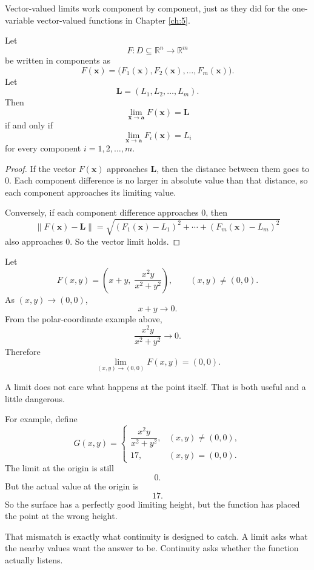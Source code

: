 Vector-valued limits work component by component, just as they did for the
one-variable vector-valued functions in Chapter \ref{ch:5}.

\begin{theorem}
Let
\[
    F:D\subseteq\mathbb R^n\to\mathbb R^m
\]
be written in components as
\[
    F(\mathbf x)=
    \bigl(F_1(\mathbf x),F_2(\mathbf x),\ldots,F_m(\mathbf x)\bigr).
\]
Let
\[
    \mathbf L=(L_1,L_2,\ldots,L_m).
\]
Then
\[
    \lim_{\mathbf x\to\mathbf a}F(\mathbf x)=\mathbf L
\]
if and only if
\[
    \lim_{\mathbf x\to\mathbf a}F_i(\mathbf x)=L_i
\]
for every component \(i=1,2,\ldots,m\).
\end{theorem}

\begin{proof}
If the vector \(F(\mathbf x)\) approaches \(\mathbf L\), then the distance between them
goes to \(0\).  Each component difference is no larger in absolute value than that
distance, so each component approaches its limiting value.

Conversely, if each component difference approaches \(0\), then
\[
    \|F(\mathbf x)-\mathbf L\|
    =
    \sqrt{
    (F_1(\mathbf x)-L_1)^2+\cdots+(F_m(\mathbf x)-L_m)^2
    }
\]
also approaches \(0\).  So the vector limit holds.
\end{proof}

\begin{example}
Let
\[
    F(x,y)=
    \left(
        x+y,\;
        \frac{x^2y}{x^2+y^2}
    \right),
    \qquad (x,y)\ne(0,0).
\]
As \((x,y)\to(0,0)\),
\[
    x+y\to0.
\]
From the polar-coordinate example above,
\[
    \frac{x^2y}{x^2+y^2}\to0.
\]
Therefore
\[
    \lim_{(x,y)\to(0,0)}F(x,y)=(0,0).
\]
\end{example}

A limit does not care what happens at the point itself.  That is both useful and a little
dangerous.

For example, define
\[
    G(x,y)=
    \begin{cases}
    \dfrac{x^2y}{x^2+y^2}, & (x,y)\ne(0,0),\\[2mm]
    17, & (x,y)=(0,0).
    \end{cases}
\]
The limit at the origin is still
\[
    0.
\]
But the actual value at the origin is
\[
    17.
\]
So the surface has a perfectly good limiting height, but the function has placed the
point at the wrong height.

That mismatch is exactly what continuity is designed to catch.  A limit asks what the
nearby values want the answer to be.  Continuity asks whether the function actually
listens.

